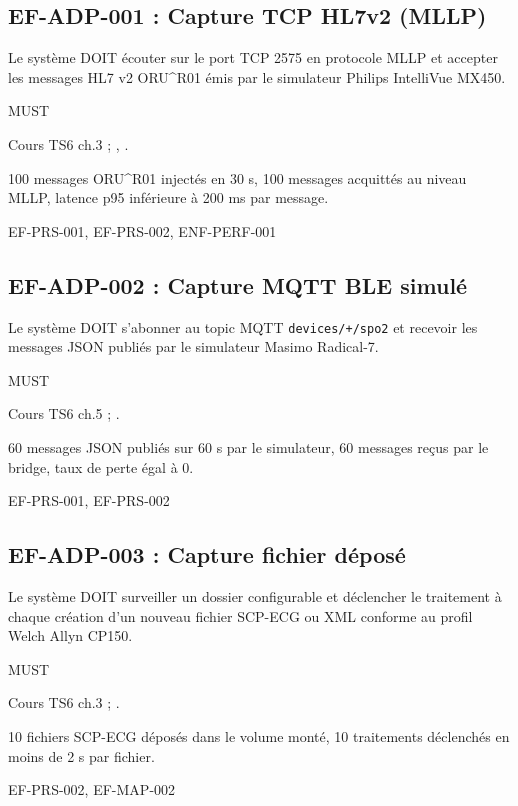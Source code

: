 \subsection*{EF-ADP-001 : Capture TCP HL7v2 (MLLP)}
\begin{description}[leftmargin=2.5cm, style=nextline]
  \item[Énoncé] Le système DOIT écouter sur le port TCP 2575 en protocole MLLP et accepter les messages HL7 v2 ORU\textasciicircum{}R01 émis par le simulateur Philips IntelliVue MX450.
  \item[Priorité] MUST
  \item[Source] Cours TS6 ch.3 ; \cite{philips_piic_ix}, \cite{ihe_pcd_tf}.
  \item[Recette] 100 messages ORU\textasciicircum{}R01 injectés en 30 s, 100 messages acquittés au niveau MLLP, latence p95 inférieure à 200 ms par message.
  \item[Lié à] EF-PRS-001, EF-PRS-002, ENF-PERF-001
\end{description}

\subsection*{EF-ADP-002 : Capture MQTT BLE simulé}
\begin{description}[leftmargin=2.5cm, style=nextline]
  \item[Énoncé] Le système DOIT s'abonner au topic MQTT \texttt{devices/+/spo2} et recevoir les messages JSON publiés par le simulateur Masimo Radical-7.
  \item[Priorité] MUST
  \item[Source] Cours TS6 ch.5 ; \cite{masimo_radical7_manual}.
  \item[Recette] 60 messages JSON publiés sur 60 s par le simulateur, 60 messages reçus par le bridge, taux de perte égal à 0.
  \item[Lié à] EF-PRS-001, EF-PRS-002
\end{description}

\subsection*{EF-ADP-003 : Capture fichier déposé}
\begin{description}[leftmargin=2.5cm, style=nextline]
  \item[Énoncé] Le système DOIT surveiller un dossier configurable et déclencher le traitement à chaque création d'un nouveau fichier SCP-ECG ou XML conforme au profil Welch Allyn CP150.
  \item[Priorité] MUST
  \item[Source] Cours TS6 ch.3 ; \cite{welchallyn_cp150_dfu}.
  \item[Recette] 10 fichiers SCP-ECG déposés dans le volume monté, 10 traitements déclenchés en moins de 2 s par fichier.
  \item[Lié à] EF-PRS-002, EF-MAP-002
\end{description}

